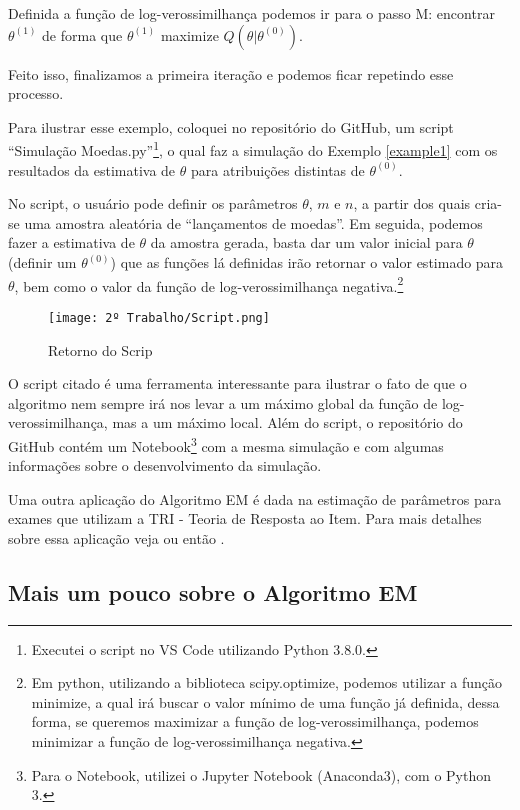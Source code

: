 \documentclass{article}
\begin{document}
Definida a função de log-verossimilhança podemos ir para o passo M: encontrar $\theta^{(1)}$ de forma que $\theta^{(1)}$ maximize $Q\left(\theta | \theta^{(0)}\right)$.

Feito isso, finalizamos a primeira iteração e podemos ficar repetindo esse processo.

Para ilustrar esse exemplo, coloquei no repositório do GitHub, um script ``Simulação Moedas.py''\footnote{Executei o script no VS Code utilizando Python 3.8.0.}, o qual faz a simulação do Exemplo \ref{example1} com os resultados da estimativa de $\theta$ para atribuições distintas de $\theta^{(0)}$.

No script, o usuário pode definir os parâmetros $\theta$, $m$ e $n$, a partir dos quais cria-se uma amostra aleatória de ``lançamentos de moedas''. Em seguida, podemos fazer a estimativa de $\theta$ da amostra gerada, basta dar um valor inicial para $\theta$ (definir um $\theta^{(0)}$) que as funções lá definidas irão retornar o valor estimado para $\theta$, bem como o valor da função de log-verossimilhança negativa.\footnote{Em python, utilizando a biblioteca scipy.optimize, podemos utilizar a função minimize, a qual irá buscar o valor mínimo de uma função já definida, dessa forma, se queremos maximizar a função de log-verossimilhança, podemos minimizar a função de log-verossimilhança negativa.}

\begin{figure}[H]
    \centering
    \texttt{[image: 2º Trabalho/Script.png]}
    \caption{Retorno do Scrip}
    \label{script}
\end{figure}

O script citado é uma ferramenta interessante para ilustrar o fato de que o algoritmo nem sempre irá nos levar a um máximo global da função de log-verossimilhança, mas a um máximo local. Além do script, o repositório do GitHub contém um Notebook\footnote{Para o Notebook, utilizei o Jupyter Notebook (Anaconda3), com o Python 3.} com a mesma simulação e com algumas informações sobre o desenvolvimento da simulação.

Uma outra aplicação do Algoritmo EM é dada na estimação de parâmetros para exames que utilizam a TRI - Teoria de Resposta ao Item. Para mais detalhes sobre essa aplicação veja \cite{IRT} ou então \cite{Rubin2001}.

\subsection*{Mais um pouco sobre o Algoritmo EM}
\end{document}
